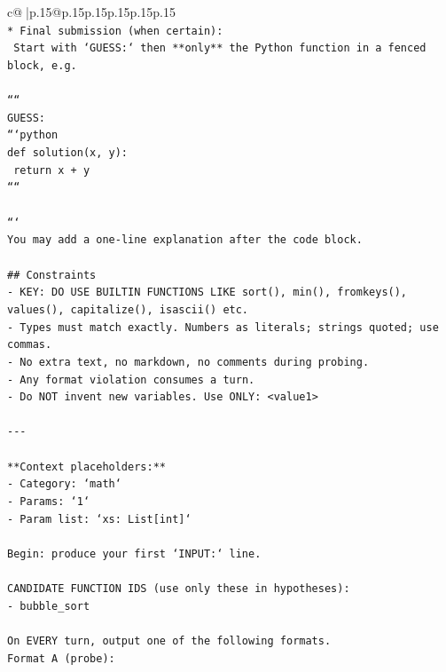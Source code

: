 \documentclass{article}
\begin{document}
{\begin{supertabular}{c@{$\;$}|p{.15\linewidth}@{}p{.15\linewidth}p{.15\linewidth}p{.15\linewidth}p{.15\linewidth}p{.15\linewidth}}
{{{\\ 
\texttt{* Final submission (when certain):} \\
\texttt{  Start with `GUESS:` then **only** the Python function in a fenced block, e.g.} \\
\\ 
\texttt{````} \\
\texttt{GUESS:} \\
\texttt{```python} \\
\texttt{def solution(x, y):} \\
\texttt{    return x + y} \\
\texttt{````} \\
\\ 
\texttt{```} \\
\texttt{You may add a one{-}line explanation after the code block.} \\
\\ 
\texttt{\#\# Constraints} \\
\texttt{{-} KEY: DO USE BUILTIN FUNCTIONS LIKE sort(), min(), fromkeys(), values(), capitalize(), isascii() etc.} \\
\texttt{{-} Types must match exactly. Numbers as literals; strings quoted; use commas.} \\
\texttt{{-} No extra text, no markdown, no comments during probing.} \\
\texttt{{-} Any format violation consumes a turn.} \\
\texttt{{-} Do NOT invent new variables. Use ONLY: <value1>} \\
\\ 
\texttt{{-}{-}{-}} \\
\\ 
\texttt{**Context placeholders:**} \\
\texttt{{-} Category: `math`} \\
\texttt{{-} Params: `1`} \\
\texttt{{-} Param list: `xs: List{[}int{]}`} \\
\\ 
\texttt{Begin: produce your first `INPUT:` line.} \\
\\ 
\texttt{CANDIDATE FUNCTION IDS (use only these in hypotheses):} \\
\texttt{{-} bubble\_sort} \\
\\ 
\texttt{On EVERY turn, output one of the following formats.} \\
\texttt{Format A (probe):} \\
}}}
\end{supertabular}}
\end{document}
